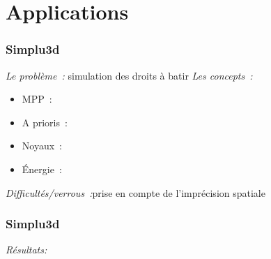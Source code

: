 \documentclass{beamer}
\begin{document}
\section{Applications}
\begin{frame}
\frametitle{Simplu3d}
\emph{Le probl\`eme~:} simulation des droits \`a batir
\emph{Les concepts~:}
\begin{itemize}
\item MPP~:
\item A prioris~:
\item Noyaux~:
\item \'Energie~:
\end{itemize}
\emph{Difficultés/verrous~:}prise en compte de l'impr\'ecision spatiale
\end{frame}

\begin{frame}
\frametitle{Simplu3d}
\emph{R\'esultats:}
\end{frame}
\end{document}
